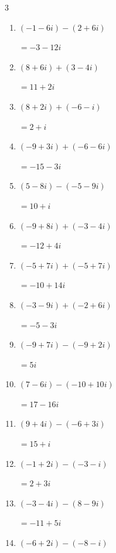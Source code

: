 \begin{multicols}{3}
\begin{enumerate}
  \item $\displaystyle (-1-6i) - (2+6i)$

        $\displaystyle =-3-12i$

  \item $\displaystyle (8+6i) + (3-4i)$

        $\displaystyle =11+2i$

  \item $\displaystyle (8+2i) + (-6-i)$

        $\displaystyle =2+i$

  \item $\displaystyle (-9+3i) + (-6-6i)$

        $\displaystyle =-15-3i$

  \item $\displaystyle (5-8i) - (-5-9i)$

        $\displaystyle =10+i$

  \item $\displaystyle (-9+8i) + (-3-4i)$

        $\displaystyle =-12+4i$

  \item $\displaystyle (-5+7i) + (-5+7i)$

        $\displaystyle =-10+14i$

  \item $\displaystyle (-3-9i) + (-2+6i)$

        $\displaystyle =-5-3i$

  \item $\displaystyle (-9+7i) - (-9+2i)$

        $\displaystyle =5i$

  \item $\displaystyle (7-6i) - (-10+10i)$

        $\displaystyle =17-16i$

  \item $\displaystyle (9+4i) - (-6+3i)$

        $\displaystyle =15+i$

  \item $\displaystyle (-1+2i) - (-3-i)$

        $\displaystyle =2+3i$

  \item $\displaystyle (-3-4i) - (8-9i)$

        $\displaystyle =-11+5i$

\columnbreak %

  \item $\displaystyle (-6+2i) - (-8-i)$


\end{enumerate}
\end{multicols}
